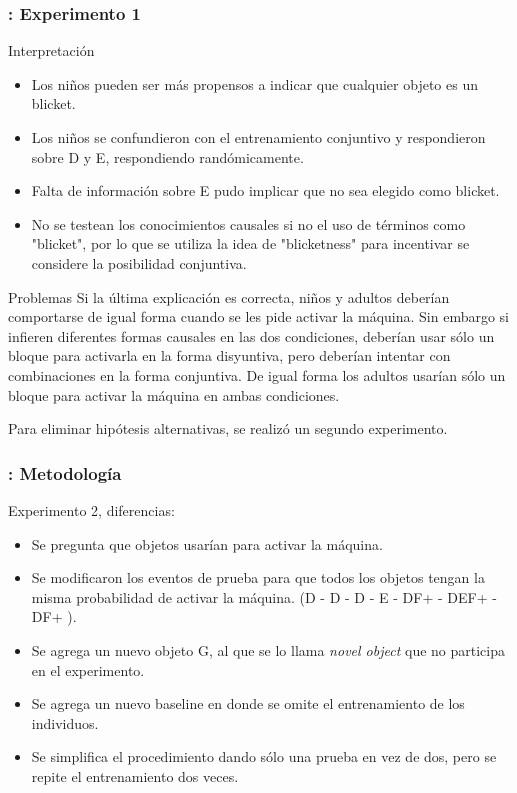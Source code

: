 \begin{frame}[fragile]
  \frametitle{\shortt: Experimento 1}

    \begin{block}{Interpretación}
    \begin{itemize}
    \item Los niños pueden ser más propensos a indicar que cualquier objeto es un blicket.
    \item Los niños se confundieron con el entrenamiento conjuntivo y respondieron sobre D y E, respondiendo randómicamente.
    \item Falta de información sobre E pudo implicar que no sea elegido como blicket.
    \item No se testean los conocimientos causales si no el uso de términos como "blicket", por lo que se utiliza la idea de "blicketness" para incentivar se considere la posibilidad conjuntiva.
    \end{itemize}
    \end{block}
    \begin{block}{Problemas}
    Si la última explicación es correcta, niños y adultos deberían comportarse de igual forma cuando se les pide activar la máquina.
    Sin embargo si infieren diferentes formas causales en las dos condiciones, deberían usar sólo un bloque para activarla en la forma disyuntiva, pero deberían intentar con combinaciones en la forma conjuntiva.
    De igual forma los adultos usarían sólo un bloque para activar la máquina en ambas condiciones.
    
    Para eliminar hipótesis alternativas, se realizó un segundo experimento.
    \end{block}



\end{frame}

\begin{frame}[fragile]
  \frametitle{\shortt: Metodología}

Experimento 2, diferencias:

\begin{itemize}
\item Se pregunta que objetos usarían para activar la máquina.
\item Se modificaron los eventos de prueba para que todos los objetos tengan la misma probabilidad de activar la máquina. (D - D - D - E - DF+ - DEF+ - DF+ ).
\item Se agrega un nuevo objeto G, al que se lo llama \textit{novel object} que no participa en el experimento.
\item Se agrega un nuevo baseline en donde se omite el entrenamiento de los individuos.
\item Se simplifica el procedimiento dando sólo una prueba en vez de dos, pero se repite el entrenamiento dos veces.
\end{itemize}


\end{frame}

